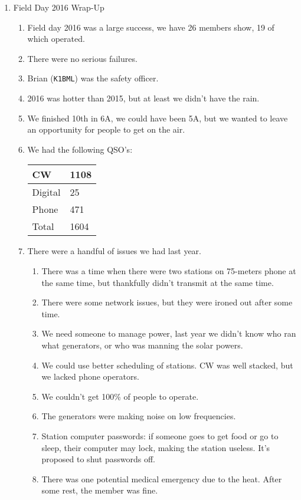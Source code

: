 \documentclass[10pt,letterpaper]{article}
\begin{document}
\begin{enumerate}
  \item Field Day 2016 Wrap-Up
  \begin{enumerate}
    \item Field day 2016 was a large success, we have 26 members show, 19 of which operated.
    \item There were no serious failures.
    \item Brian (\texttt{K1BML}) was the safety officer.
    \item 2016 was hotter than 2015, but at least we didn't have the rain.
    \item We finished 10th in 6A, we could have been 5A, but we wanted to leave an opportunity for people to get on the air.
    \item We had the following QSO's:\\
    \begin{tabular}{|l|l|}
    \hline
    CW      & 1108 \\ \hline
    Digital & 25   \\ \hline
    Phone   & 471  \\ \hline \hline
    Total   & 1604 \\ \hline
    \end{tabular}
    \item There were a handful of issues we had last year.
    \begin{enumerate}
      \item There was a time when there were two stations on 75-meters phone at the same time, but thankfully didn't transmit at the same time.
      \item There were some network issues, but they were ironed out after some time.
      \item We need someone to manage power, last year we didn't know who ran what generators, or who was manning the solar powers.
      \item We could use better scheduling of stations. CW was well stacked, but we lacked phone operators.
      \item We couldn't get 100\% of people to operate.
      \item The generators were making noise on low frequencies.
      \item Station computer passwords: if someone goes to get food or go to sleep, their computer may lock, making the station useless. It's proposed to shut passwords off.
      \item There was one potential medical emergency due to the heat. After some rest, the member was fine.

\end{enumerate}
\end{enumerate}
\end{enumerate}
\end{document}

